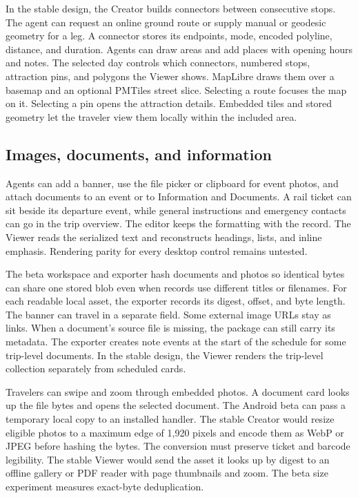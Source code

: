 In the stable design, the Creator builds connectors between consecutive stops. The agent can request an online ground route or supply manual or geodesic geometry for a leg. A connector stores its endpoints, mode, encoded polyline, distance, and duration. Agents can draw areas and add places with opening hours and notes. The selected day controls which connectors, numbered stops, attraction pins, and polygons the Viewer shows. MapLibre draws them over a basemap and an optional PMTiles street slice. Selecting a route focuses the map on it. Selecting a pin opens the attraction details. Embedded tiles and stored geometry let the traveler view them locally within the included area.

\subsection{Images, documents, and information}
Agents can add a banner, use the file picker or clipboard for event photos, and attach documents to an event or to Information and Documents. A rail ticket can sit beside its departure event, while general instructions and emergency contacts can go in the trip overview. The editor keeps the formatting with the record. The Viewer reads the serialized text and reconstructs headings, lists, and inline emphasis. Rendering parity for every desktop control remains untested.

The beta workspace and exporter hash documents and photos so identical bytes can share one stored blob even when records use different titles or filenames. For each readable local asset, the exporter records its digest, offset, and byte length. The banner can travel in a separate field. Some external image URLs stay as links. When a document's source file is missing, the package can still carry its metadata. The exporter creates note events at the start of the schedule for some trip-level documents. In the stable design, the Viewer renders the trip-level collection separately from scheduled cards.

Travelers can swipe and zoom through embedded photos. A document card looks up the file bytes and opens the selected document. The Android beta can pass a temporary local copy to an installed handler. The stable Creator would resize eligible photos to a maximum edge of 1,920 pixels and encode them as WebP or JPEG before hashing the bytes. The conversion must preserve ticket and barcode legibility. The stable Viewer would send the asset it looks up by digest to an offline gallery or PDF reader with page thumbnails and zoom. The beta size experiment measures exact-byte deduplication.

